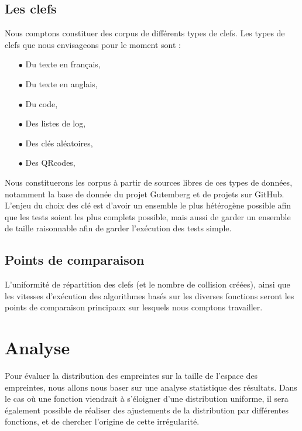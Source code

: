 \documentclass[final,twoside,article,10pt]{scrartcl}
\begin{document}
	\subsection{Les clefs}
		Nous comptons constituer des corpus de différents types de clefs. Les types de clefs que nous envisageons pour le moment sont :
		\begin{itemize}
			\item[$\bullet$]Du texte en français,
			\item[$\bullet$]Du texte en anglais,
			\item[$\bullet$]Du code,
			\item[$\bullet$]Des listes de log,
			\item[$\bullet$]Des clés aléatoires,
			\item[$\bullet$]Des QRcodes,
		\end{itemize}
		Nous constituerons les corpus à partir de sources libres de ces types de données, notamment la base de donnée du projet Gutemberg et de projets sur GitHub. L'enjeu du choix des clé est d'avoir un ensemble le plus hétérogène possible afin que les tests soient les plus complets possible, mais aussi de garder un ensemble de taille raisonnable afin de garder l'exécution des tests simple.
		
	\subsection{Points de comparaison}
		L'uniformité de répartition des clefs (et le nombre de collision créées), ainsi que les vitesses d'exécution des algorithmes basés sur les diverses fonctions seront les points de comparaison principaux sur lesquels nous comptons travailler.

\section{Analyse}
	Pour évaluer la distribution des empreintes sur la taille de l'espace des empreintes, nous allons nous baser sur une analyse statistique des résultats. Dans le cas où une fonction viendrait à s'éloigner d'une distribution uniforme, il sera également possible de réaliser des ajustements de la distribution par différentes fonctions, et de chercher l'origine de cette irrégularité.
\end{document}
